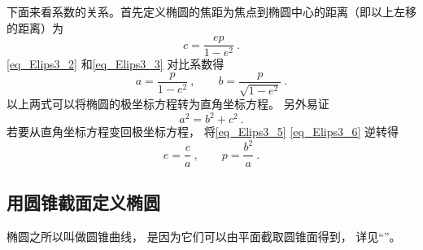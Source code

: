 下面来看系数的关系。首先定义椭圆的焦距为焦点到椭圆中心的距离（即以上左移的距离）为
\begin{equation}\label{eq_Elips3_5}
c = \frac{ep}{1 - e^2}~.
\end{equation}
\autoref{eq_Elips3_2} 和\autoref{eq_Elips3_3} 对比系数得
\begin{equation}\label{eq_Elips3_6}
a = \frac{p}{1 - e^2}~, \qquad b = \frac{p}{\sqrt {1 - e^2} }~.
\end{equation}
以上两式可以将椭圆的极坐标方程转为直角坐标方程。 另外易证
\begin{equation}\label{eq_Elips3_7}
a^2 = b^2 + c^2~.
\end{equation}
若要从直角坐标方程变回极坐标方程， 将\autoref{eq_Elips3_5} \autoref{eq_Elips3_6} 逆转得
\begin{equation}\label{eq_Elips3_8}
e = \frac{c}{a}~,\qquad
p = \frac{b^2}{a}~.
\end{equation}


\subsection{用圆锥截面定义椭圆}
椭圆之所以叫做圆锥曲线， 是因为它们可以由平面截取圆锥面得到， 详见“”。
